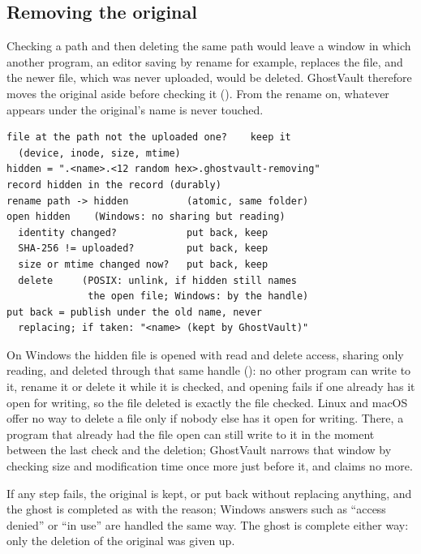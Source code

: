 \subsection{Removing the original}\label{sec:remove}
Checking a path and then deleting the same path would leave a window in which another program, an
editor saving by rename for example, replaces the file, and the newer file, which was never
uploaded, would be deleted. GhostVault therefore moves the original aside before checking it
(). From the rename on, whatever appears under the original's name is never
touched.

\begin{lstlisting}[caption={Removing the original, once the record says \state{removing-original}.},
label={lst:remove}]
file at the path not the uploaded one?    keep it
  (device, inode, size, mtime)
hidden = ".<name>.<12 random hex>.ghostvault-removing"
record hidden in the record (durably)
rename path -> hidden          (atomic, same folder)
open hidden    (Windows: no sharing but reading)
  identity changed?            put back, keep
  SHA-256 != uploaded?         put back, keep
  size or mtime changed now?   put back, keep
  delete     (POSIX: unlink, if hidden still names
              the open file; Windows: by the handle)
put back = publish under the old name, never
  replacing; if taken: "<name> (kept by GhostVault)"
\end{lstlisting}

On Windows the hidden file is opened with read and delete access, sharing only reading, and deleted
through that same handle (): no other program can write to it,
rename it or delete it while it is checked, and opening fails if one already has it open for
writing, so the file deleted is exactly the file checked. Linux and macOS offer no way to delete a
file only if nobody else has it open for writing. There, a program that already had the file open
can still write to it in the moment between the last check and the deletion; GhostVault narrows
that window by checking size and modification time once more just before it, and claims no more.

If any step fails, the original is kept, or put back without replacing anything, and the ghost is
completed as  with the reason; Windows answers such as ``access denied'' or ``in use''
are handled the same way. The ghost is complete either way: only the deletion of the original was
given up.
